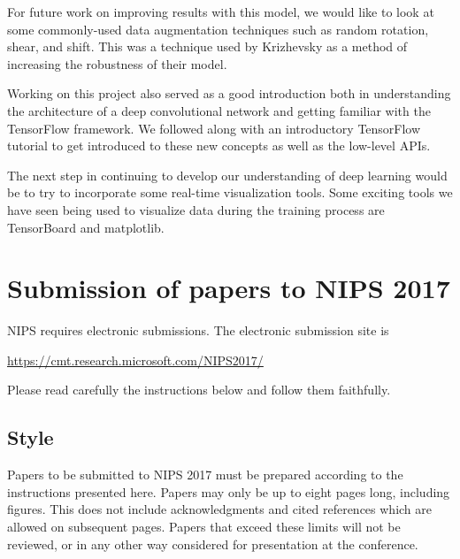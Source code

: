 \documentclass{article}
\begin{document}
For future work on improving results with this model, we would like to look at some commonly-used data augmentation techniques such as random rotation, shear, and shift. This was a technique used by Krizhevsky as a method of increasing the robustness of their model. 

Working on this project also served as a good introduction both in understanding the architecture of a deep convolutional network and getting familiar with the TensorFlow framework. We followed along with an introductory TensorFlow tutorial to get introduced to these new concepts as well as the low-level APIs.

The next step in continuing to develop our understanding of deep learning would 
be to try to incorporate some real-time visualization tools. Some exciting 
tools we have seen being used to visualize data during the training process are TensorBoard and matplotlib. 






\newpage



\section{Submission of papers to NIPS 2017}

NIPS requires electronic submissions.  The electronic submission site
is
\begin{center}
  \url{https://cmt.research.microsoft.com/NIPS2017/}
\end{center}

Please read carefully the instructions below and follow them
faithfully.

\subsection{Style}

Papers to be submitted to NIPS 2017 must be prepared according to the
instructions presented here. Papers may only be up to eight pages
long, including figures. This does not include acknowledgments and 
cited references which are allowed on subsequent pages.
Papers that exceed these limits will not be reviewed, or in any
other way considered for presentation at the conference.
\end{document}
